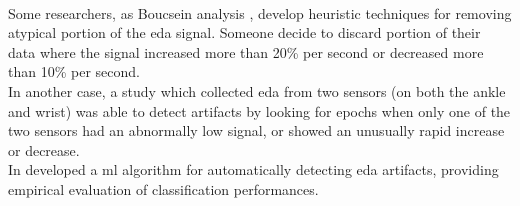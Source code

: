 \\
Some researchers, as Boucsein analysis \cite{boucsein2012electrodermal}, develop heuristic techniques for removing atypical portion of the \gls{eda} signal. Someone decide to discard portion of their data where the signal increased more than 20\% per second or decreased more than 10\% per second.
\\
In another case, a study which collected \gls{eda} from two sensors (on both the ankle and wrist) \cite{hedman2010situ} was able to detect artifacts by looking for epochs when only one of the two sensors had an abnormally low signal, or showed an unusually rapid increase or decrease.
\\ \indent
In \cite{taylor2015automatic} developed a \gls{ml} algorithm for automatically detecting \gls{eda} artifacts, providing empirical evaluation of classification performances.

\newpage
